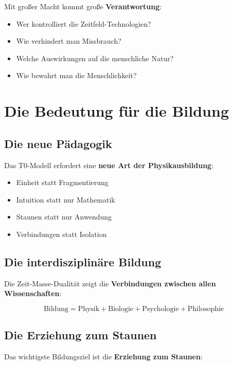 \documentclass[12pt,a4paper]{report}
\begin{document}
	Mit großer Macht kommt große \textbf{Verantwortung}:
	
	\begin{itemize}
		\item Wer kontrolliert die Zeitfeld-Technologien?
		\item Wie verhindert man Missbrauch?
		\item Welche Auswirkungen auf die menschliche Natur?
		\item Wie bewahrt man die Menschlichkeit?
	\end{itemize}
	
	\section{Die Bedeutung für die Bildung}
	
	\subsection{Die neue Pädagogik}
	
	Das T0-Modell erfordert eine \textbf{neue Art der Physikausbildung}:
	
	\begin{itemize}
		\item Einheit statt Fragmentierung
		\item Intuition statt nur Mathematik
		\item Staunen statt nur Anwendung
		\item Verbindungen statt Isolation
	\end{itemize}
	
	\subsection{Die interdisziplinäre Bildung}
	
	Die Zeit-Masse-Dualität zeigt die \textbf{Verbindungen zwischen allen Wissenschaften}:
	
	\begin{equation}
		\text{Bildung} = \text{Physik} + \text{Biologie} + \text{Psychologie} + \text{Philosophie}
	\end{equation}
	
	\subsection{Die Erziehung zum Staunen}
	
	Das wichtigste Bildungsziel ist die \textbf{Erziehung zum Staunen}:
	
\end{document}
